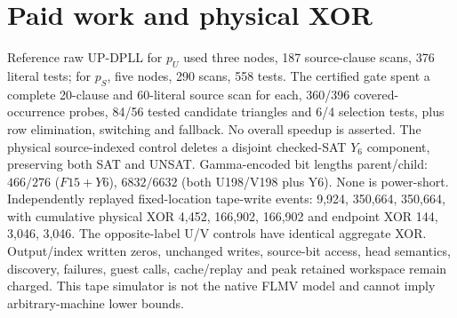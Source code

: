 \documentclass[11pt]{article}
\begin{document}
\section*{Paid work and physical XOR}
Reference raw UP-DPLL for $p_U$ used three nodes, 187 source-clause scans, 376 literal tests; for $p_S$, five nodes, 290 scans, 558 tests. The certified gate spent a complete 20-clause and 60-literal source scan for each, 360/396 covered-occurrence probes, 84/56 tested candidate triangles and 6/4 selection tests, plus row elimination, switching and fallback. No overall speedup is asserted.
The physical source-indexed control deletes a disjoint checked-SAT $Y_6$ component, preserving both SAT and UNSAT. Gamma-encoded bit lengths parent/child: $466/276$ ($F15+Y6$), $6832/6632$ (both U198/V198 plus Y6). None is power-short. Independently replayed fixed-location tape-write events: 9,924, 350,664, 350,664, with cumulative physical XOR 4,452, 166,902, 166,902 and endpoint XOR 144, 3,046, 3,046. The opposite-label U/V controls have identical aggregate XOR. Output/index written zeros, unchanged writes, source-bit access, head semantics, discovery, failures, guest calls, cache/replay and peak retained workspace remain charged. This tape simulator is not the native FLMV model and cannot imply arbitrary-machine lower bounds.
\end{document}
